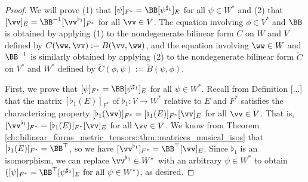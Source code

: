 \begin{proof}
    We will prove (1) that $[\psi]_{F^*} = \BB [\psi^{\sharp_1}]_E$ for all $\psi \in W^*$ and (2) that $[\vv]_E = \BB^{-1} [\vv^{\flat_1}]_{F^*}$ for all $\vv \in V$. The equation involving $\phi \in V^*$ and $\BB$ is obtained by applying (1) to the nondegenerate bilinear form $C$ on $W$ and $V$ defined by $C(\ww, \vv) := B(\vv, \ww)$, and the equation involving $\ww \in W$ and $\BB^{-1}$ is similarly obtained by applying (2) to the nondegenerate bilinear form $\widetilde{C}$ on $V^*$ and $W^*$ defined by $\widetilde{C}(\phi, \psi) := \widetilde{B}(\psi, \phi)$.

    First, we prove that $[\psi]_{F^*} = \BB [\psi^{\sharp_1}]_E$ for all $\psi \in W^*$. Recall from Definition [...] that the matrix $[\flat_1(E)]_{F^*}$ of $\flat_1:V \rightarrow W^*$ relative to $E$ and $F^*$ satisfies the characterizing property $[\flat_1(\vv)]_{F^*} = [\flat_1(E)]_{F^*} [\vv]_E$ for all $\vv \in V$. That is, $[\vv^{\flat_1}]_{F^*} = [\flat_1(E)]_{F^*} [\vv]_E$ for all $\vv \in V$. We know from Theorem \ref{ch::bilinear_forms_metric_tensors::thm::matrices_musical_isos} that $[\flat_1(E)]_{F^*} = \BB^\top$, so we have $[\vv^{\flat_1}]_{F^*} = \BB^\top [\vv]_E$. Since $\flat_1$ is an isomorphism, we can replace $\vv^{\flat_1} \in W^*$ with an arbitrary $\psi \in W^*$ to obtain $([\psi]_{F^*} = \BB^\top [\psi^{\sharp_1}]_E \text{ for all } \psi \in W^*)$, as desired.
    

\end{proof}
